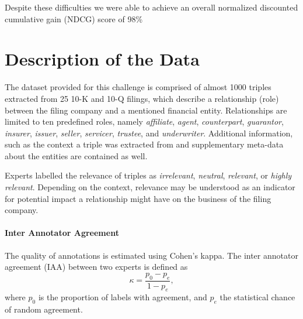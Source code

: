 Despite these difficulties we were able to achieve an overall normalized discounted cumulative gain (NDCG) score of 98\%

\section{Description of the Data}
The dataset provided for this challenge is comprised of almost 1000 triples extracted from 25 10-K and 10-Q filings, which describe a relationship (role) between the filing company and a mentioned financial entity.
Relationships are limited to ten predefined roles, namely \textit{affiliate}, \textit{agent}, \textit{counterpart}, \textit{guarantor}, \textit{insurer}, \textit{issuer}, \textit{seller}, \textit{servicer}, \textit{trustee}, and \textit{underwriter}.
Additional information, such as the context a triple was extracted from and supplementary meta-data about the entities are contained as well.

Experts labelled the relevance of triples as \textit{irrelevant}, \textit{neutral}, \textit{relevant}, or \textit{highly relevant}.
Depending on the context, relevance may be understood as an indicator for potential impact a relationship might have on the business of the filing company. 


\paragraph{\textbf{Inter Annotator Agreement}}
The quality of annotations is estimated using Cohen's kappa. The inter annotator agreement (IAA) between two experts is defined as
$$
\kappa = \frac{p_0-p_e}{1-p_e},
$$
where $p_0$ is the proportion of labels with agreement, and $p_e$ the statistical chance of random agreement.

